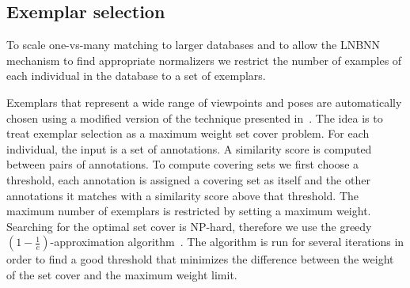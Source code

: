 


\subsection{Exemplar selection}\label{sec:exempselect}
    To scale one-vs-many matching to larger databases and to allow the LNBNN
    mechanism to find appropriate normalizers we restrict the number of
    examples of each individual in the database to a set of exemplars.

    Exemplars that represent a wide range of viewpoints and poses are
      automatically chosen using a modified version of the technique presented
      in~\cite{oddone_mobile_2016}.
    The idea is to treat exemplar selection as a maximum weight set cover
      problem.
    For each individual, the input is a set of annotations.
    A similarity score is computed between pairs of annotations.
    To compute covering sets we first choose a threshold, each annotation is
      assigned a covering set as itself and the other annotations it matches
      with a similarity score above that threshold.
    The maximum number of exemplars is restricted by setting a maximum weight.
    Searching for the optimal set cover is NP-hard, therefore we use the
      greedy %
    $(1 - \frac{1}{e})$-approximation algorithm~\cite{michael_guide_1979}.
    The algorithm is run for several iterations in order to find a good
      threshold that minimizes the difference between the weight of the set
      cover and the maximum weight limit.


